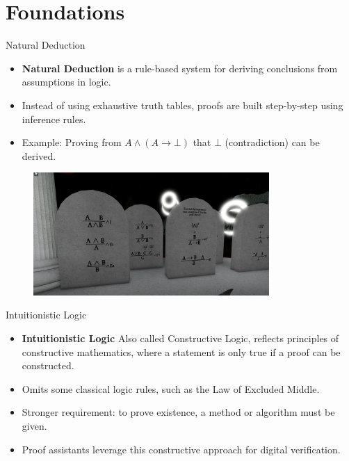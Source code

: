 \documentclass[aspectratio=169, 12pt]{beamer}
\begin{document}
\section{Foundations}

\begin{frame}{Natural Deduction}
\begin{itemize}
    \item \textbf{Natural Deduction} is a rule-based system for deriving conclusions from assumptions in logic.
    \item Instead of using exhaustive truth tables, proofs are built step-by-step using inference rules.
    \item Example: Proving from $A \land (A \rightarrow \bot)$ that $\bot$ (contradiction) can be derived.
\end{itemize}
\end{frame}
\begin{frame}
    \begin{figure}[h]
  \centering
  \includegraphics[width=0.8\textwidth]{nd.jpeg}
\end{figure}
\end{frame}

\begin{frame}{Intuitionistic Logic}
\begin{itemize}
    \item \textbf{Intuitionistic Logic} Also called Constructive Logic, reflects principles of constructive mathematics, where a statement is only true if a proof can be constructed.
    \item Omits some classical logic rules, such as the Law of Excluded Middle.
    \item Stronger requirement: to prove existence, a method or algorithm must be given.
    \item Proof assistants leverage this constructive approach for digital verification.
\end{itemize}
\end{frame}
 
\end{document}
